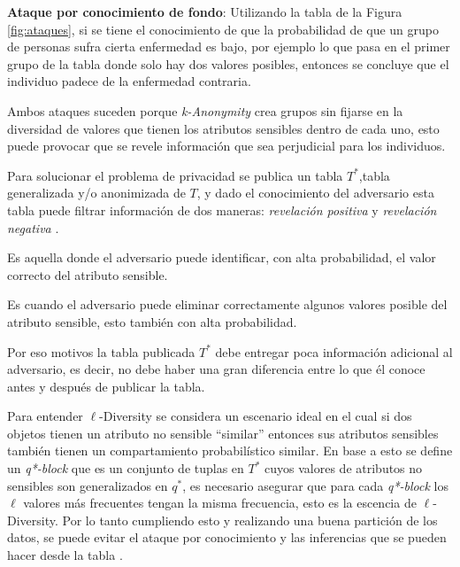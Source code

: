 \textbf{Ataque por conocimiento de fondo}: Utilizando la tabla de la Figura  \ref{fig:ataques}, si se tiene el conocimiento de que la probabilidad de que un grupo de personas sufra cierta enfermedad es bajo, por ejemplo lo que pasa en el primer grupo de la tabla donde solo hay dos valores posibles, entonces se concluye que el individuo padece de la enfermedad contraria.

Ambos ataques suceden porque \textit{k-Anonymity} crea grupos sin fijarse en la diversidad de valores que tienen los atributos sensibles dentro de cada uno, esto puede provocar que se revele información que sea perjudicial para los individuos.

Para solucionar el problema de privacidad se publica un tabla $T^{*}$,tabla generalizada y/o anonimizada de $T$, y dado el conocimiento del adversario esta tabla puede filtrar información de dos maneras: \textit{revelación positiva} y \textit{revelación negativa} \cite{machanavajjhala2006ell}.

\begin{definicion}
  Es aquella donde el adversario puede identificar, con alta probabilidad, el valor correcto del atributo sensible.
\end{definicion}

\begin{definicion}
  Es cuando el adversario puede eliminar correctamente algunos valores posible del atributo sensible, esto también con alta probabilidad.
\end{definicion}

Por eso motivos la tabla publicada $T^*$ debe entregar poca información adicional al adversario, es decir, no debe haber una gran diferencia entre lo que él conoce antes y después de publicar la tabla.

Para entender $\ell$-Diversity se considera un escenario ideal en el cual si dos objetos tienen un atributo no sensible ``similar'' entonces sus atributos sensibles también tienen un compartamiento probabilístico similar. En base a esto se define un \textit{q*-block} que es un conjunto de tuplas en $T^*$ cuyos valores de atributos no sensibles son generalizados en $q^*$, es necesario asegurar que para cada \textit{q*-block} los $\ell$ valores más frecuentes tengan la misma frecuencia, esto es la escencia de $\ell$-Diversity. Por lo tanto cumpliendo esto y realizando una buena partición de los datos, se puede evitar el ataque por conocimiento y las inferencias que se pueden hacer desde la tabla \cite{machanavajjhala2006ell}.

